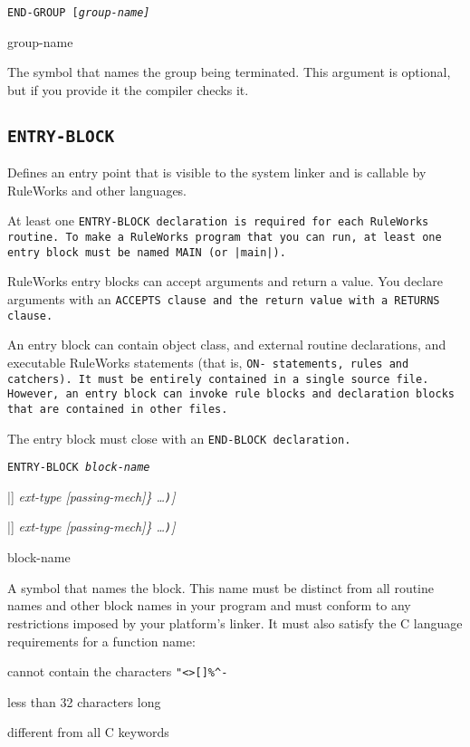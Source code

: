\Format

\tt{END-GROUP} [\it{group-name}]

\begin{arguments}
\item[group-name]

  The symbol that names the group being terminated. This argument is
  optional, but if you provide it the compiler checks it.
\end{arguments}

\subsection{\tt{ENTRY-BLOCK}}

Defines an entry point that is visible to the system linker and is
callable by RuleWorks and other languages.

At least one \tt{ENTRY-BLOCK} declaration is required for each
RuleWorks routine. To make a RuleWorks program that you can run, at
least one entry block must be named \tt{MAIN} (or \tt{|main|}).

RuleWorks entry blocks can accept arguments and return a value.
You declare arguments with an \tt{ACCEPTS} clause and the return value
with a \tt{RETURNS} clause.

An entry block can contain object class, and external routine
declarations, and executable RuleWorks statements (that is, \tt{ON-}
statements, rules and catchers). It must be entirely contained in a
single source file. However, an entry block can invoke rule blocks and
declaration blocks that are contained in other files.

The entry block must close with an \tt{END-BLOCK} declaration.

\Format

\tt{ENTRY-BLOCK} \it{block-name}

\qquad[\tt{(ACCEPTS} \{\verb|<|\it{f-param-name}\verb|>|
[\verb|[|\it{size}\verb|]|] \it{ext-type} [\it{passing-mech}]\} \ldots\verb|)|]

\qquad[\tt{(RETURNS} \{\verb|<|\it{f-param-name}\verb|>|
[\verb|[|\it{size}\verb|]|] \it{ext-type} [\it{passing-mech}]\} \ldots\verb|)|]


  

\begin{arguments}
\item[block-name]

  A symbol that names the block. This name must be distinct from all
  routine names and other block names in your program and must conform
  to any restrictions imposed by your platform's linker. It must also
  satisfy the C language requirements for a function name:

  \qquad cannot contain the characters \verb,"<>[]%^-,

  \qquad less than 32 characters long

  \qquad different from all C keywords
\end{arguments}

